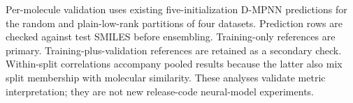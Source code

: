 Per-molecule validation uses existing five-initialization D-MPNN predictions
for the random and plain-low-rank partitions of four datasets. Prediction rows
are checked against test SMILES before ensembling. Training-only references are
primary. Training-plus-validation references are retained as a secondary check.
Within-split correlations accompany pooled results because the latter also mix
split membership with molecular similarity. These analyses validate metric
interpretation; they are not new release-code neural-model experiments.


